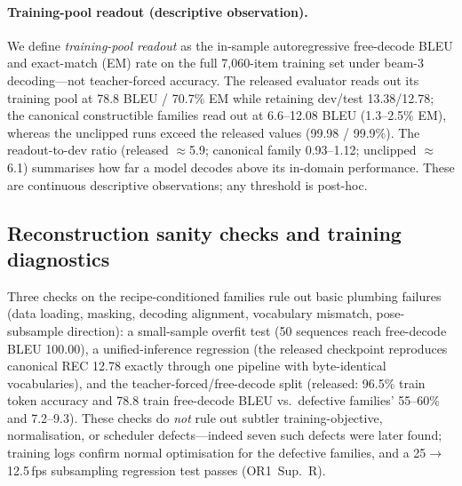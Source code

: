 \documentclass[pdflatex,sn-chicago]{sn-jnl}
\begin{document}
\paragraph{Training-pool readout (descriptive observation).}
\label{sec:readout_def}
We define \emph{training-pool readout} as the in-sample autoregressive free-decode BLEU and exact-match (EM) rate on the full 7{,}060-item training set under beam-3 decoding---not teacher-forced accuracy. The released evaluator reads out its training pool at 78.8 BLEU / 70.7\% EM while retaining dev/test 13.38/12.78; the canonical constructible families read out at 6.6--12.08 BLEU (1.3--2.5\% EM), whereas the unclipped runs exceed the released values (99.98 / 99.9\%). The readout-to-dev ratio (released $\approx$5.9; canonical family 0.93--1.12; unclipped $\approx$6.1) summarises how far a model decodes above its in-domain performance. These are continuous descriptive observations; any threshold is post-hoc.

\subsection{Reconstruction sanity checks and training diagnostics}
\label{sec:sanity_checks}
Three checks on the recipe-conditioned families rule out basic plumbing failures (data loading, masking, decoding alignment, vocabulary mismatch, pose-subsample direction): a small-sample overfit test (50 sequences reach free-decode BLEU 100.00), a unified-inference regression (the released checkpoint reproduces canonical REC 12.78 exactly through one pipeline with byte-identical vocabularies), and the teacher-forced/free-decode split (released: 96.5\% train token accuracy and 78.8 train free-decode BLEU vs.\ defective families' 55--60\% and 7.2--9.3). These checks do \emph{not} rule out subtler training-objective, normalisation, or scheduler defects---indeed seven such defects were later found; training logs confirm normal optimisation for the defective families, and a 25$\to$12.5\,fps subsampling regression test passes (OR1~Sup.~R).
\end{document}
